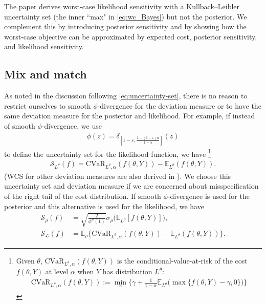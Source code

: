 \documentclass[10pt,a4paper]{amsart}
\numberwithin{equation}{section}
\numberwithin{theorem}{section}
\numberwithin{table}{section}
\numberwithin{figure}{section}
\begin{document}
The paper \cite{shapiro2023bayesian} derives worst-case likelihood sensitivity  with a Kullback--Leibler uncertainty set (the inner ``max" in \eqref{eq:wc_Bayes}) but not the posterior. We complement this by introducing posterior sensitivity and by showing how the worst-case objective can be approximated by  expected cost, posterior sensitivity, and likelihood sensitivity.


\subsection{Mix and match}
\label{sec:mix}

As noted in the discussion following \eqref{eq:uncertainty-set}, there is no reason to restrict ourselves to smooth $\phi$-divergence for the deviation measure or to have the same deviation measure for the posterior and likelihood. For example, if instead of smooth $\phi$-divergence, we use 
\begin{eqnarray*}
\phi(z)=\delta_{[1-\varepsilon,\frac{1-(1-\varepsilon)\alpha}{1-\alpha}]}(z)
\end{eqnarray*} 
to define the uncertainty set for the likelihood function, we have \cite{gotoh2026sensitivity}\footnote{Given $\theta$, $\mathrm{CVaR}_{L^\theta,\alpha}(f(\theta, Y))$ is the conditional-value-at-risk of the cost $f(\theta, Y)$ at level $\alpha$ when $Y$ has distribution $L^\theta$: \begin{eqnarray*}\mathrm{CVaR}_{L^\theta,\alpha}(f(\theta, Y)):=\min_\gamma\Big\{\gamma+\frac{1}{1-\alpha}\mathbb{E}_{L^\theta}\Big(\max\big\{f(\theta, Y)-\gamma,0\big\}\Big)\Big\}\end{eqnarray*}}
\begin{eqnarray*} 
{\mathcal S}_{L^\theta}(f) = \mathrm{CVaR}_{L^\theta,\alpha}(f(\theta, Y))-\mathbb{E}_{L^\theta} (f(\theta, Y)).
\end{eqnarray*} 
(WCS for other deviation measures are also derived in \cite{gotoh2026sensitivity}). We choose this uncertainty set and deviation measure if we are concerned about misspecification of the right tail of the cost distribution. 
If smooth $\phi$-divergence is used for the posterior and this alternative is used for the likelihood, we have
\begin{align*}
{\mathcal S}_{\rho}(f) &= \sqrt{\frac{2}{\phi''(1)}}{\sigma}_\rho\Big({\mathbb E}_{L^\theta}[f(\theta, Y)]\Big), \\[5pt]
{\mathcal S}_{\mathcal L}(f) & = {\mathbb E}_\rho \Big\{\mathrm{CVaR}_{L^\theta, \alpha}(f(\theta, Y))-\mathbb{E}_{L^\theta} (f(\theta, Y))\Big\}.
\end{align*}
\end{document}
